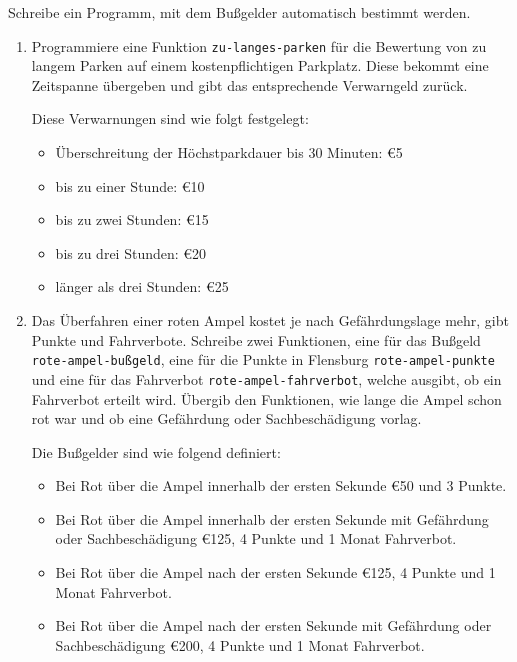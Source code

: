 \begin{aufgabe}
  Schreibe ein Programm, mit dem Bußgelder
  automatisch bestimmt werden.
  
  \begin{enumerate}
  \item Programmiere eine Funktion \texttt{zu-langes-parken}
    für die Bewertung von zu langem Parken auf einem kostenpflichtigen
    Parkplatz. Diese bekommt eine Zeitspanne übergeben und gibt das 
    entsprechende Verwarngeld zurück.
    
    Diese Verwarnungen sind wie folgt festgelegt:
    \begin{itemize}
    \item Überschreitung der Höchstparkdauer bis 30 Minuten: \euro{5}
    \item bis zu einer Stunde: \euro{10}
    \item bis zu zwei Stunden: \euro{15}
    \item bis zu drei Stunden: \euro{20}
    \item länger als drei Stunden:  \euro{25}
    \end{itemize}
    
  \item Das Überfahren einer roten Ampel kostet je nach
    Gefährdungslage mehr, gibt Punkte und Fahrverbote. Schreibe
    zwei Funktionen, eine für das Bußgeld \texttt{rote-ampel-bußgeld}, 
    eine für die Punkte in Flensburg \texttt{rote-ampel-punkte} 
    und eine für das Fahrverbot \texttt{rote-ampel-fahrverbot}, 
    welche ausgibt, ob ein Fahrverbot erteilt wird. Übergib
    den Funktionen, wie lange die Ampel schon rot war und ob eine
    Gefährdung oder Sachbeschädigung vorlag.
    
    Die Bußgelder sind wie folgend definiert:
    \begin{itemize}
    \item Bei Rot über die Ampel innerhalb der ersten Sekunde			
      \euro{50} und 3 Punkte.
    \item Bei Rot über die Ampel innerhalb der ersten Sekunde mit
      Gefährdung oder Sachbeschädigung \euro{125}, 4 		
      Punkte und 1 Monat Fahrverbot.
    \item Bei Rot über die Ampel nach der ersten Sekunde \euro{125},
      4 Punkte und 1 Monat Fahrverbot.
    \item Bei Rot über die Ampel nach der ersten Sekunde mit
      Gefährdung oder Sachbeschädigung \euro{200}, 4
      Punkte und 1 Monat Fahrverbot.
    \end{itemize}
    
    
  \end{enumerate}
\end{aufgabe}


